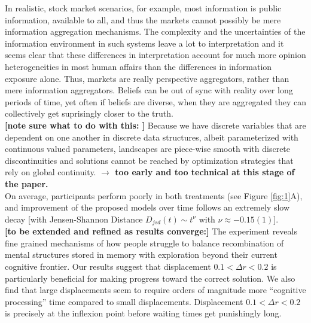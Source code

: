 In realistic, stock market scenarios, for example, most information is public information, available to all, and thus the markets cannot possibly be mere information aggregation mechanisms. The complexity and the uncertainties of the information environment in such systems leave a lot to interpretation and it seems clear that these differences in interpretation account for much more opinion heterogeneities in most human affairs than the differences in information exposure alone. Thus, markets are really perspective aggregators, rather than mere information aggregators. Beliefs can be out of sync with reality over long periods of time, yet often if beliefs are diverse, when they are aggregated they can collectively get suprisingly closer to the truth. \\

{\bf [note sure what to do with this: ]} Because we have discrete variables that are dependent on one another in discrete data structures, albeit parameterized with continuous valued parameters, landscapes are piece-wise smooth with discrete discontinuities and solutions cannot be reached by optimization strategies that rely on global continuity. {\bf $\rightarrow$ too early and too technical at this stage of the paper.} \\

On average, participants perform poorly in both treatments (see Figure \ref{fig:1}A), and improvement of the proposed models over time follows an extremely slow decay [with Jensen-Shannon Distance $D_{jsd}(t) \sim t^{\nu}$ with $ \nu \approx -0.15(1)$]. \\

{\bf [to be extended and refined as results converge:]} The experiment reveals fine grained mechanisms of how people struggle to balance recombination of mental structures stored in memory with exploration beyond their current cognitive frontier.  Our results suggest that displacement $0.1 < \Delta r < 0.2 $ is particularly beneficial for making progress toward the correct solution. We also find that large displacements seem to require orders of magnitude more ``cognitive processing'' time compared to small displacements. Displacement $0.1 < \Delta r < 0.2 $ is precisely at the inflexion point before waiting times get punishingly long.\\


